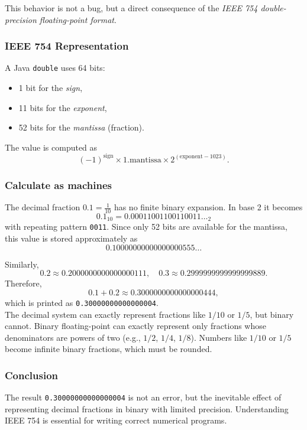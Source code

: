 \documentclass{article}
\begin{document}
This behavior is not a bug, but a direct consequence of the \emph{IEEE 754 double-precision floating-point format}.

\subsubsection{IEEE 754 Representation}
A Java \texttt{double} uses 64 bits:
\begin{itemize}
	\item 1 bit for the \emph{sign},
	\item 11 bits for the \emph{exponent},
	\item 52 bits for the \emph{mantissa} (fraction).
\end{itemize}

The value is computed as
\[
(-1)^{\text{sign}} \times 1.\text{mantissa} \times 2^{(\text{exponent} - 1023)}.
\]

\subsubsection{Calculate as machines}
The decimal fraction $0.1 = \tfrac{1}{10}$ has no finite binary expansion.
In base 2 it becomes
\[
0.1_{10} = 0.00011001100110011\ldots_2
\]
with repeating pattern \texttt{0011}. Since only 52 bits are available for
the mantissa, this value is stored approximately as
\[
0.10000000000000000555\ldots
\]

Similarly,
\[
0.2 \approx 0.2000000000000000111, \quad
0.3 \approx 0.2999999999999999889.
\]
Therefore,
\[
0.1 + 0.2 \approx 0.3000000000000000444,
\]
which is printed as \texttt{0.30000000000000004}.
\\
The decimal system can exactly represent fractions like $1/10$ or $1/5$,
but binary cannot. Binary floating-point can exactly represent only fractions
whose denominators are powers of two (e.g., $1/2$, $1/4$, $1/8$). Numbers like
$1/10$ or $1/5$ become infinite binary fractions, which must be rounded.

\subsubsection{Conclusion}
The result \texttt{0.30000000000000004} is not an error, but the inevitable
effect of representing decimal fractions in binary with limited precision.
Understanding IEEE 754 is essential for writing correct numerical programs.
\end{document}
